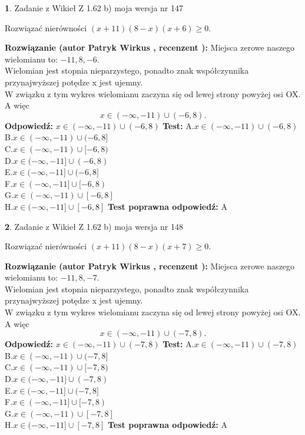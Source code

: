 \documentclass[12pt, a4paper]{article}
\theoremstyle{definition} %
\newtheorem{zad}{}
\newcommand{\zadStart}[1]{\begin{zad}#1\newline}
\newcommand{\zadStop}{\end{zad}}
\newcommand{\rozwStart}[2]{\noindent \textbf{Rozwiązanie (autor #1 , recenzent #2): }\newline}
\newcommand{\rozwStop}{\newline}
\newcommand{\odpStart}{\noindent \textbf{Odpowiedź:}\newline}
\newcommand{\odpStop}{\newline}
\newcommand{\testStart}{\noindent \textbf{Test:}\newline}
\newcommand{\testStop}{\newline}
\newcommand{\kluczStart}{\noindent \textbf{Test poprawna odpowiedź:}\newline}
\newcommand{\kluczStop}{\newline}
\begin{document}
\zadStart{Zadanie z Wikieł Z 1.62 b) moja wersja nr 147}

Rozwiązać nierówności $(x+11)(8-x)(x+6)\ge0$.
\zadStop
\rozwStart{Patryk Wirkus}{}
Miejsca zerowe naszego wielomianu to: $-11, 8, -6$.\\
Wielomian jest stopnia nieparzystego, ponadto znak współczynnika przy\linebreak najwyższej potędze x jest ujemny.\\ W związku z tym wykres wielomianu zaczyna się od lewej strony powyżej osi OX. A więc $$x \in (-\infty,-11) \cup (-6,8).$$
\rozwStop
\odpStart
$x \in (-\infty,-11) \cup (-6,8)$
\odpStop
\testStart
A.$x \in (-\infty,-11) \cup (-6,8)$\\
B.$x \in (-\infty,-11) \cup (-6,8]$\\
C.$x \in (-\infty,-11) \cup [-6,8)$\\
D.$x \in (-\infty,-11] \cup (-6,8)$\\
E.$x \in (-\infty,-11] \cup (-6,8]$\\
F.$x \in (-\infty,-11] \cup [-6,8)$\\
G.$x \in (-\infty,-11) \cup [-6,8]$\\
H.$x \in (-\infty,-11] \cup [-6,8]$
\testStop
\kluczStart
A
\kluczStop



\zadStart{Zadanie z Wikieł Z 1.62 b) moja wersja nr 148}

Rozwiązać nierówności $(x+11)(8-x)(x+7)\ge0$.
\zadStop
\rozwStart{Patryk Wirkus}{}
Miejsca zerowe naszego wielomianu to: $-11, 8, -7$.\\
Wielomian jest stopnia nieparzystego, ponadto znak współczynnika przy\linebreak najwyższej potędze x jest ujemny.\\ W związku z tym wykres wielomianu zaczyna się od lewej strony powyżej osi OX. A więc $$x \in (-\infty,-11) \cup (-7,8).$$
\rozwStop
\odpStart
$x \in (-\infty,-11) \cup (-7,8)$
\odpStop
\testStart
A.$x \in (-\infty,-11) \cup (-7,8)$\\
B.$x \in (-\infty,-11) \cup (-7,8]$\\
C.$x \in (-\infty,-11) \cup [-7,8)$\\
D.$x \in (-\infty,-11] \cup (-7,8)$\\
E.$x \in (-\infty,-11] \cup (-7,8]$\\
F.$x \in (-\infty,-11] \cup [-7,8)$\\
G.$x \in (-\infty,-11) \cup [-7,8]$\\
H.$x \in (-\infty,-11] \cup [-7,8]$
\testStop
\kluczStart
A
\kluczStop
\end{document}
